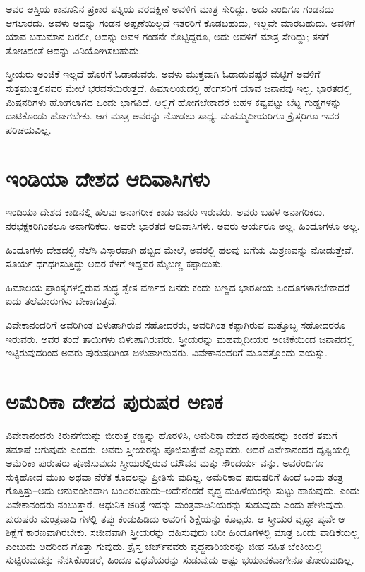 ಅವರ ಆಸ್ತಿಯ ಕಾನೂನಿನ ಪ್ರಕಾರ ಪತ್ನಿಯ ವರದಕ್ಷಿಣೆ ಅವಳಿಗೆ ಮಾತ್ರ ಸೇರಿದ್ದು. ಅದು ಎಂದಿಗೂ ಗಂಡನದು ಆಗಲಾರದು. ಅವಳು ಅದನ್ನು ಗಂಡನ ಅಪ್ಪಣೆಯಿಲ್ಲದೆ ಇತರರಿಗೆ ಕೊಡಬಹುದು, ಇಲ್ಲವೇ ಮಾರಬಹುದು. ಅವಳಿಗೆ ಯಾವ ಬಹುಮಾನ ಬರಲೀ, ಅದನ್ನು ಅವಳ ಗಂಡನೇ ಕೊಟ್ಟಿದ್ದರೂ, ಅದು ಅವಳಿಗೆ ಮಾತ್ರ ಸೇರಿದ್ದು; ತನಗೆ ತೋಚಿದಂತೆ ಅದನ್ನು ವಿನಿಯೋಗಿಸಬಹುದು.

ಸ್ತ್ರೀಯರು ಅಂಜಿಕೆ ಇಲ್ಲದೆ ಹೊರಗೆ ಓಡಾಡುವರು. ಅವಳು ಮುಕ್ತವಾಗಿ ಓಡಾಡುವಷ್ಟರ ಮಟ್ಟಿಗೆ ಅವಳಿಗೆ ಸುತ್ತಮುತ್ತಲಿನವರ ಮೇಲೆ ಭರವಸೆಯಿರುತ್ತದೆ. ಹಿಮಾಲಯದಲ್ಲಿ ಹೆಂಗಸರಿಗೆ ಯಾವ ಜನಾನವು ಇಲ್ಲ. ಭಾರತದಲ್ಲಿ ಮಿಷನರಿಗಳು ಹೋಗಲಾಗದ ಒಂದು ಭಾಗವಿದೆ. ಅಲ್ಲಿಗೆ ಹೋಗಬೇಕಾದರೆ ಬಹಳ ಕಷ್ಟಪಟ್ಟು ಬೆಟ್ಟ ಗುಡ್ಡಗಳನ್ನು ದಾಟಿಕೊಂಡು ಹೋಗಬೇಕು. ಆಗ ಮಾತ್ರ ಅವರನ್ನು ನೋಡಲು ಸಾಧ್ಯ. ಮಹಮ್ಮದೀಯರಿಗೂ ಕ್ರೈಸ್ತರಿಗೂ ಇವರ ಪರಿಚಯವಿಲ್ಲ.

\delimiter


\section{ಇಂಡಿಯಾ ದೇಶದ ಆದಿವಾಸಿಗಳು}

ಇಂಡಿಯಾ ದೇಶದ ಕಾಡಿನಲ್ಲಿ ಹಲವು ಅನಾಗರೀಕ ಕಾಡು ಜನರು ಇರುವರು. ಅವರು ಬಹಳ ಅನಾಗರಿಕರು. ನರಭಕ್ಷಕರಿಗಿಂತಲೂ ಅನಾಗರಿಕರು. ಅವರೇ ಭಾರತದ ಆದಿವಾಸಿಗಳು. ಅವರು ಆರ್ಯರೂ ಅಲ್ಲ, ಹಿಂದೂಗಳೂ ಅಲ್ಲ.

ಹಿಂದೂಗಳು ದೇಶದಲ್ಲಿ ನೆಲೆಸಿ ವಿಸ್ತಾರವಾಗಿ ಹಬ್ಬಿದ ಮೇಲೆ, ಅವರಲ್ಲಿ ಹಲವು ಬಗೆಯ ಮಿಶ್ರಣವನ್ನು ನೋಡುತ್ತೇವೆ. ಸೂರ್ಯ ಧಗಧಗಿಸುತ್ತಿದ್ದು ಅದರ ಕೆಳಗೆ ಇದ್ದವರ ಮೈಬಣ್ಣ ಕಪ್ಪಾಯಿತು.

ಹಿಮಾಲಯ ಪ್ರಾಂತ್ಯಗಳಲ್ಲಿರುವ ಶುದ್ಧ ಶ್ವೇತ ವರ್ಣದ ಜನರು ಕಂದು ಬಣ್ಣದ ಭಾರತೀಯ ಹಿಂದೂಗಳಾಗಬೇಕಾದರೆ ಐದು ತಲೆಮಾರುಗಳು ಬೇಕಾಗುತ್ತದೆ.

ವಿವೇಕಾನಂದರಿಗೆ ಅವರಿಗಿಂತ ಬಿಳುಪಾಗಿರುವ ಸಹೋದರರು, ಅವರಿಗಿಂತ ಕಪ್ಪಾಗಿರುವ ಮತ್ತೊಬ್ಬ ಸಹೋದರರೂ ಇರುವರು. ಅವರ ತಂದೆ ತಾಯಿಗಳು ಬಿಳುಪಾಗಿರುವರು. ಸ್ತ್ರೀಯರನ್ನು ಮಹಮ್ಮದೀಯರ ಅಂಜಿಕೆಯಿಂದ ಜನಾನದಲ್ಲಿ ಇಟ್ಟಿರುವುದರಿಂದ ಅವರು ಪುರುಷರಿಗಿಂತ ಬಿಳುಪಾಗಿರುವರು. ವಿವೇಕಾನಂದರಿಗೆ ಮೂವತ್ತೊಂದು ವಯಸ್ಸು.

\delimiter


\section{ಅಮೆರಿಕಾ ದೇಶದ ಪುರುಷರ ಅಣಕ}

ವಿವೇಕಾನಂದರು ಕಿರುನಗೆಯನ್ನು ಬೀರುತ್ತ ಕಣ್ಣನ್ನು ಹೊರಳಿಸಿ, ಅಮೆರಿಕಾ ದೇಶದ ಪುರುಷರನ್ನು ಕಂಡರೆ ತಮಗೆ ತಮಾಷೆ ಆಗುವುದು ಎಂದರು. ಅವರು ಸ್ತ್ರೀಯರನ್ನು ಪೂಜಿಸುತ್ತೇವೆ ಎನ್ನುವರು. ಅದರೆ ವಿವೇಕಾನಂದರ ದೃಷ್ಟಿಯಲ್ಲಿ ಅಮೆರಿಕಾ ಪುರುಷರು ಪೂಜಿಸುವುದು ಸ್ತ್ರೀಯರಲ್ಲಿರುವ ಯೌವನ ಮತ್ತು ಸೌಂದರ್ಯ ವನ್ನು. ಅವರೆಂದಿಗೂ ಸುಕ್ಕಿಹೋದ ಮುಖ ಅಥವಾ ನೆರೆತ ಕೂದಲನ್ನು ಪ್ರೀತಿಸು ವುದಿಲ್ಲ. ಅಮೆರಿಕಾದ ಪುರುಷರಿಗೆ ಹಿಂದೆ ಒಂದು ತಂತ್ರ ಗೊತ್ತಿತ್ತು–ಅದು ಆನುವಂಶಿಕವಾಗಿ ಬಂದಿರಬಹುದು–ಅದೇನೆಂದರೆ ವೃದ್ಧ ಮಹಿಳೆಯರನ್ನು ಸುಟ್ಟು ಹಾಕುವುದು, ಎಂದು ವಿವೇಕಾನಂದರು ನಂಬುತ್ತಾರೆ. ಆಧುನಿಕ ಚರಿತ್ರೆ ಇದನ್ನು ಮಂತ್ರವಾದಿನಿಯರನ್ನು ಸುಡುವುದು ಎಂದು ಹೇಳುವುದು. ಪುರುಷರು ಮಂತ್ರವಾದಿ ಗಳಲ್ಲಿ ತಪ್ಪು ಕಂಡುಹಿಡಿದು ಅವರಿಗೆ ಶಿಕ್ಷೆಯನ್ನು ಕೊಟ್ಟರು. ಆ ಸ್ತ್ರೀಯರ ವೃದ್ಧಾ ಪ್ಯವೇ ಆ ಶಿಕ್ಷೆಗೆ ಕಾರಣವಾಗಿರಬೇಕು. ಸಜೀವವಾಗಿ ಸ್ತ್ರೀಯರನ್ನು ದಹಿಸುವುದು ಬರೀ ಹಿಂದೂಗಳಲ್ಲಿ ಮಾತ್ರ ಒಂದು ವಾಡಿಕೆಯಲ್ಲ ಎಂಬುದು ಅದರಿಂದ ಗೊತ್ತಾ ಗುವುದು. ಕ್ರೈಸ್ತ ಚರ್ಚ್​ನವರು ವೃದ್ಧನಾರಿಯರನ್ನು ಜೀವ ಸಹಿತ ಬೆಂಕಿಯಲ್ಲಿ ಸುಟ್ಟಿರುವುದನ್ನು ನೆನಸಿಕೊಂಡರೆ, ಹಿಂದೂ ವಿಧವೆಯರನ್ನು ಸುಡುವುದು ಅಷ್ಟು ಭಯಾನಕವಾಗೇನೂ ತೋರುವುದಿಲ್ಲ.



